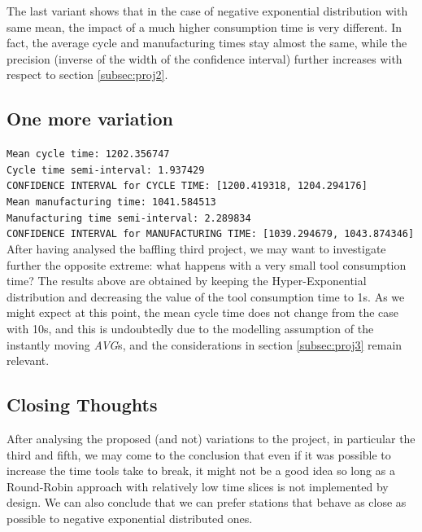 \documentclass[paper=a4, fontsize=11pt]{scrartcl}
\numberwithin{equation}{section}		%
\numberwithin{figure}{section}			%
\numberwithin{table}{section}				%
\begin{document}
The last variant shows that in the case of negative exponential distribution with same mean, the impact of a much higher consumption time is very different. In fact, the average cycle and manufacturing times stay almost the same, while the precision (inverse of the width of the confidence interval) further increases with respect to section \ref{subsec:proj2}.

\subsection{One more variation}
\texttt{Mean cycle time: 1202.356747\\
Cycle time semi-interval: 1.937429\\
CONFIDENCE INTERVAL for CYCLE TIME: [1200.419318, 1204.294176]\\
Mean manufacturing time: 1041.584513\\
Manufacturing time semi-interval: 2.289834\\
CONFIDENCE INTERVAL for MANUFACTURING TIME: [1039.294679, 1043.874346]}\\

After having analysed the baffling third project, we may want to investigate further the opposite extreme: what happens with a very small tool consumption time? The results above are obtained by keeping the Hyper-Exponential distribution and decreasing the value of the tool consumption time to 1s. As we might expect at this point, the mean cycle time does not change from the case with 10s, and this is undoubtedly due to the modelling assumption of the instantly moving \textit{AVG}s, and the considerations in section \ref{subsec:proj3} remain relevant.

\subsection{Closing Thoughts}
After analysing the proposed (and not) variations to the project, in particular the third and fifth, we may come to the conclusion that even if it was possible to increase the time tools take to break, it might not be a good idea so long as a Round-Robin approach with relatively low time slices is not implemented by design. We can also conclude that we can prefer stations that behave as close as possible to negative exponential distributed ones.


\end{document}
